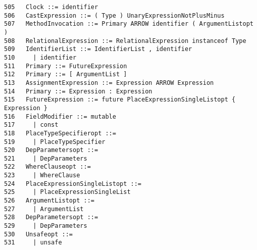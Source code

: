 {\begin{verbatim}
505   Clock ::= identifier
506   CastExpression ::= ( Type ) UnaryExpressionNotPlusMinus
507   MethodInvocation ::= Primary ARROW identifier ( ArgumentListopt )
508   RelationalExpression ::= RelationalExpression instanceof Type
509   IdentifierList ::= IdentifierList , identifier
510     | identifier
511   Primary ::= FutureExpression
512   Primary ::= [ ArgumentList ]
513   AssignmentExpression ::= Expression ARROW Expression
514   Primary ::= Expression : Expression
515   FutureExpression ::= future PlaceExpressionSingleListopt { Expression }
516   FieldModifier ::= mutable
517     | const
518   PlaceTypeSpecifieropt ::=
519     | PlaceTypeSpecifier
520   DepParametersopt ::=
521     | DepParameters
522   WhereClauseopt ::=
523     | WhereClause
524   PlaceExpressionSingleListopt ::=
525     | PlaceExpressionSingleList
526   ArgumentListopt ::=
527     | ArgumentList
528   DepParametersopt ::=
529     | DepParameters
530   Unsafeopt ::=
531     | unsafe
\end{verbatim}
}
\twocolumn
